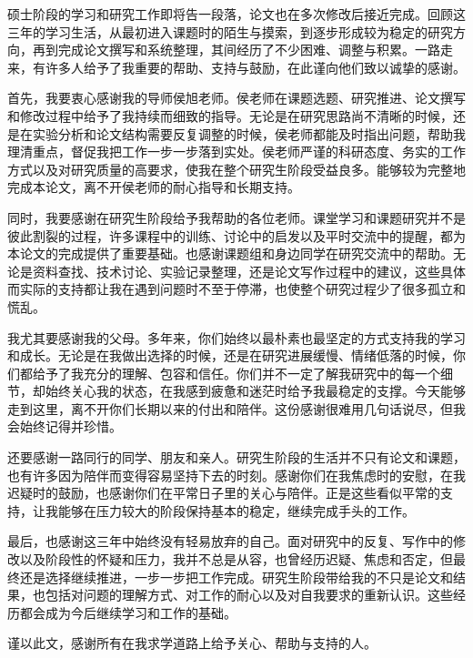 
\begin{acknowledgements}

硕士阶段的学习和研究工作即将告一段落，论文也在多次修改后接近完成。回顾这三年的学习生活，从最初进入课题时的陌生与摸索，到逐步形成较为稳定的研究方向，再到完成论文撰写和系统整理，其间经历了不少困难、调整与积累。一路走来，有许多人给予了我重要的帮助、支持与鼓励，在此谨向他们致以诚挚的感谢。

首先，我要衷心感谢我的导师侯旭老师。侯老师在课题选题、研究推进、论文撰写和修改过程中给予了我持续而细致的指导。无论是在研究思路尚不清晰的时候，还是在实验分析和论文结构需要反复调整的时候，侯老师都能及时指出问题，帮助我理清重点，督促我把工作一步一步落到实处。侯老师严谨的科研态度、务实的工作方式以及对研究质量的高要求，使我在整个研究生阶段受益良多。能够较为完整地完成本论文，离不开侯老师的耐心指导和长期支持。

同时，我要感谢在研究生阶段给予我帮助的各位老师。课堂学习和课题研究并不是彼此割裂的过程，许多课程中的训练、讨论中的启发以及平时交流中的提醒，都为本论文的完成提供了重要基础。也感谢课题组和身边同学在研究交流中的帮助。无论是资料查找、技术讨论、实验记录整理，还是论文写作过程中的建议，这些具体而实际的支持都让我在遇到问题时不至于停滞，也使整个研究过程少了很多孤立和慌乱。

我尤其要感谢我的父母。多年来，你们始终以最朴素也最坚定的方式支持我的学习和成长。无论是在我做出选择的时候，还是在研究进展缓慢、情绪低落的时候，你们都给予了我充分的理解、包容和信任。你们并不一定了解我研究中的每一个细节，却始终关心我的状态，在我感到疲惫和迷茫时给予我最稳定的支撑。今天能够走到这里，离不开你们长期以来的付出和陪伴。这份感谢很难用几句话说尽，但我会始终记得并珍惜。

还要感谢一路同行的同学、朋友和亲人。研究生阶段的生活并不只有论文和课题，也有许多因为陪伴而变得容易坚持下去的时刻。感谢你们在我焦虑时的安慰，在我迟疑时的鼓励，也感谢你们在平常日子里的关心与陪伴。正是这些看似平常的支持，让我能够在压力较大的阶段保持基本的稳定，继续完成手头的工作。

最后，也感谢这三年中始终没有轻易放弃的自己。面对研究中的反复、写作中的修改以及阶段性的怀疑和压力，我并不总是从容，也曾经历迟疑、焦虑和否定，但最终还是选择继续推进，一步一步把工作完成。研究生阶段带给我的不只是论文和结果，也包括对问题的理解方式、对工作的耐心以及对自我要求的重新认识。这些经历都会成为今后继续学习和工作的基础。

谨以此文，感谢所有在我求学道路上给予关心、帮助与支持的人。



\end{acknowledgements}
